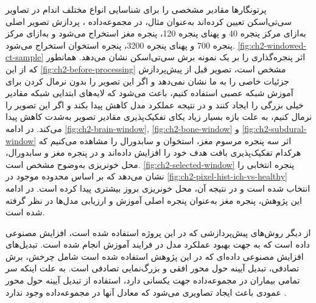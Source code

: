 پرتونگار‌ها مقادیر مشخصی را برای شناسایی انواع مختلف اندام در تصاویر سی‌تی‌اسکن تعیین کرده‌اند به‌عنوان مثال، در مجموعه‌داده
،
پردازش تصویر اصلی به‌ازای مرکز پنجره 40 و پهنای پنجره 120، پنجره مغز استخراج می‌شود و به‌ازای مرکز پنجره 700 و پهنای پنجره 3200،‌ پنجره استخوان استخراج می‌شود.
\autoref{fig:ch2-windowed-ct-sample}
اثر پنجره‌گذاری را بر یک نمونه برش سی‌تی‌اسکن نشان می‌دهد. همانطور که از این
\autoref{fig:ch2-before-processing}
 مشخص است، تصویر قبل از پیش‌پردازش جزئیات خاصی را به ما نشان نمی‌دهد و اگر این تصویر را بدون نرمال کردن برای آموزش شبکه‌ عصبی استفاده کنیم، باعث می‌شود که لایه‌های ابتدایی شبکه مقادیر خیلی بزرگی را ایجاد کنند و در نتیجه عملکرد مدل کاهش پیدا بکند و اگر این تصویر را نرمال کنیم، به علت بازه بسیار زیاد یکای 
تفکیک‌پذیری مقادیر تصویر به‌شدت کاهش پیدا می‌کند. در ادامه
\autoref{fig:ch2-brain-window}, \autoref{fig:ch2-bone-window} و \autoref{fig:ch2-subdural-window}
اثر سه پنجره مرسوم مغز، استخوان و سابدورال را مشاهده می‌کنیم که هرکدام تفکیک‌پذیری بافت هدف خود را افزایش داده‌اند و در پنجره مغز و سابدورال، محل خونریزی به‌وضوح مشخص است.
\autoref{fig:ch2-selected-window}
 پنجره انتخابی را نشان می‌دهد که بر اساس محدوده موجود در  
\autoref{fig:ch2-pixel-hist-ich-vs-healthy}
انتخاب شده ‌است و در نتیجه آن، محل خونریزی بروز بیشتری پیدا کرده است. در ادامه این پژوهش،‌ پنجره مغز به‌عنوان پنجره اصلی آموزش و ارزیابی مدل‌ها در نظر گرفته شده است.

از دیگر روش‌های پیش‌پردازشی که در این پروژه استفاده شده است، افزایش مصنوعی داده است که به جهت بهبود عملکرد مدل در فرایند آموزش انجام شده است. تبدیل‌های افزایش مصنوعی داده‌ای که در این پژوهش استفاده شده است شامل چرخش، برش تصادفی،‌ تبدیل آیینه حول محور افقی و‌ بزرگ‌نمایی تصادفی است. به علت اینکه سر تمامی بیماران در مجموعه‌داده 
جهت یکسانی دارد، استفاده از تبدیل آیینه حول محور عمودی باعث ایجاد تصاویری می‌شود که معادل آنها در مجموعه‌داده وجود ندارد
\cite{hssayeni2020intracranial}.



